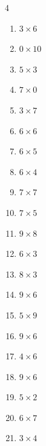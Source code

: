 \begin{multicols}{4}
\begin{enumerate}
  \item $3\times 6$
        \phantom{$=18$}

  \item $0\times 10$
        \phantom{$=0$}

  \item $5\times 3$
        \phantom{$=15$}

  \item $7\times 0$
        \phantom{$=0$}

  \item $3\times 7$
        \phantom{$=21$}

  \item $6\times 6$
        \phantom{$=36$}

  \item $6\times 5$
        \phantom{$=30$}

  \item $6\times 4$
        \phantom{$=24$}

  \item $7\times 7$
        \phantom{$=49$}

  \item $7\times 5$
        \phantom{$=35$}

  \item $9\times 8$
        \phantom{$=72$}

  \item $6\times 3$
        \phantom{$=18$}

  \item $8\times 3$
        \phantom{$=24$}

  \item $9\times 6$
        \phantom{$=54$}

  \item $5\times 9$
        \phantom{$=45$}

  \item $9\times 6$
        \phantom{$=54$}

  \item $4\times 6$
        \phantom{$=24$}

  \item $9\times 6$
        \phantom{$=54$}

  \item $5\times 2$
        \phantom{$=10$}

  \item $6\times 7$
        \phantom{$=42$}

  \item $3\times 4$
        \phantom{$=12$}


\end{enumerate}
\end{multicols}
